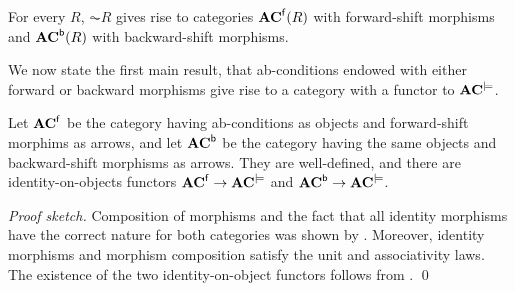 %
\iffull
\begin{proposition}
For every $R$, $\AC R$ gives rise to categories $\mathbf{AC}^{\mathsf{f}}(R)$ with forward-shift morphisms and $\mathbf{AC}^{\mathsf{b}}(R)$ with backward-shift morphisms.
\end{proposition}
%
\fi
We now state the first main result, that ab-conditions endowed with either forward or backward morphisms give rise to a category with a functor to $\mathbf{AC}^{\models}$.

\begin{theorem}
Let $\mathbf{AC}^{{\mathsf{f}}}$ be the category having ab-conditions as objects and forward-shift morphims as arrows, and let $\mathbf{AC}^{{\mathsf{b}}}$ be the category having the same objects and backward-shift morphisms as arrows. They are well-defined, and there are identity-on-objects functors $\mathbf{AC}^{{\mathsf{f}}} \rightarrow \mathbf{AC}^{\models}$ and $\mathbf{AC}^{{\mathsf{b}}} \rightarrow \mathbf{AC}^{\models}$.
\end{theorem}
%
\emph{Proof sketch.} Composition of morphisms and the fact that all identity morphisms have the correct nature for both categories was shown by .
Moreover, identity morphisms and morphism composition satisfy the unit and associativity laws. The existence of the two identity-on-object functors follows from .
\qed 


